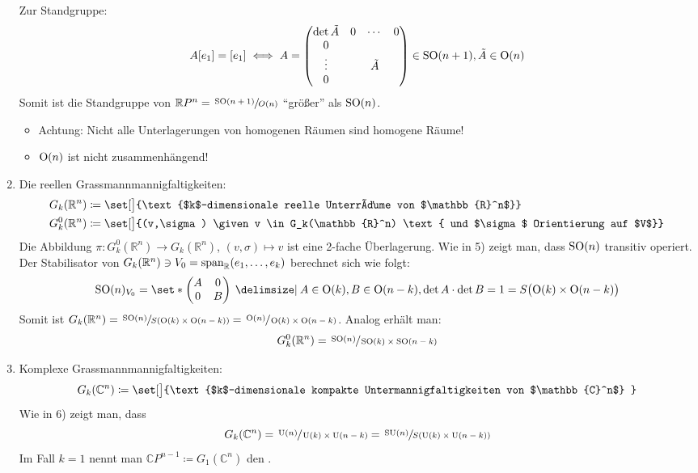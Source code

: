 \begin{beispiel*}[{name=[homogene Räume]},label=bsp:homSpaces]
\begin{enumerate}[1)]
		Zur Standgruppe: 
		\[
			A [e_1] = [e_1] \iff A= \begin{pmatrix}
				\det \tilde{A} & 0 & \cdots & 0 \\
				0 & & & \\
				\vdots & & \tilde{A} & \\
				0 & & & 
			\end{pmatrix}\in \operatorname{SO}(n+1) , \tilde{A} \in \operatorname{O}(n)
		\]
		Somit ist die Standgruppe von $\mathbb{R}P^n = \sfrac{\operatorname{SO}(n+1)}{O(n)}$ \enquote{größer} als $\operatorname{SO}(n)$.
		\begin{itemize}
			\item Achtung: Nicht alle Unterlagerungen von homogenen Räumen sind homogene Räume!
			\item $\operatorname{O}(n)$ ist nicht zusammenhängend!
		\end{itemize}
		\item Die reellen Grassmannmannigfaltigkeiten: 
		\begin{align}
			G_k (\mathbb{R}^n) &\coloneqq \set[\big]{\text{$k$-dimensionale reelle Unterräume von $\mathbb{R}^n$}} \\
			G_k^0(\mathbb{R}^n) &\coloneqq \set[\big]{(v,\sigma) \given v \in G_k(\mathbb{R}^n) \text{ und $\sigma$ Orientierung auf $V$}}
		\end{align}
		Die Abbildung $\pi \colon G_k^0(\mathbb{R}^n) \to G_k(\mathbb{R}^n)$, $(v,\sigma) \mapsto v$ ist eine 2-fache Überlagerung.
		Wie in 5) zeigt man, dass $\operatorname{SO}(n)$ transitiv operiert.
		Der Stabilisator von $G_k(\mathbb{R}^n)\ni V_0 = \operatorname{span}_\mathbb{R}(e_1, \ldots ,e_k)$ berechnet sich wie folgt:
		\[
			\SO(n)_{V_0} = \set*{ \begin{pmatrix}
				A & 0 \\ 0 & B
			\end{pmatrix} \given A \in \On(k), B \in \On(n-k), \det A \cdot \det B = 1} = S \enbrace[\big]{\On(k) \times \On(n-k)}
		\]
		Somit ist $G_k(\mathbb{R}^n) = \sfrac{\SO(n)}{S \enbrace*{\On(k) \times \On(n-k)}} = \sfrac{\On(n)}{\On(k) \times \On(n-k)}$.
		Analog erhält man:
		\[
			G_k^0(\mathbb{R}^n) = \sfrac{\operatorname{SO}(n)}{\operatorname{SO}(k) \times \operatorname{SO}(n-k)}
		\]
		\item Komplexe Grassmannmannigfaltigkeiten: 
		\[
			G_k(\mathbb{C}^n) \coloneqq \set[\big]{\text{$k$-dimensionale kompakte Untermannigfaltigkeiten von $\mathbb{C}^n$} }
		\]
		Wie in 6) zeigt man, dass 
		\[
			G_k(\mathbb{C}^n) = \sfrac{\operatorname{U}(n)}{\operatorname{U}(k) \times \operatorname{U}(n-k)} = \sfrac{\operatorname{SU}(n)}{S(\operatorname{U}(k) \times \operatorname{U}(n-k))}
		\]
		Im Fall $k=1$ nennt man $\mathbb{C}P^{n-1} \coloneqq G_1(\mathbb{C}^n)$ den . 

\end{enumerate}
\end{beispiel*}
